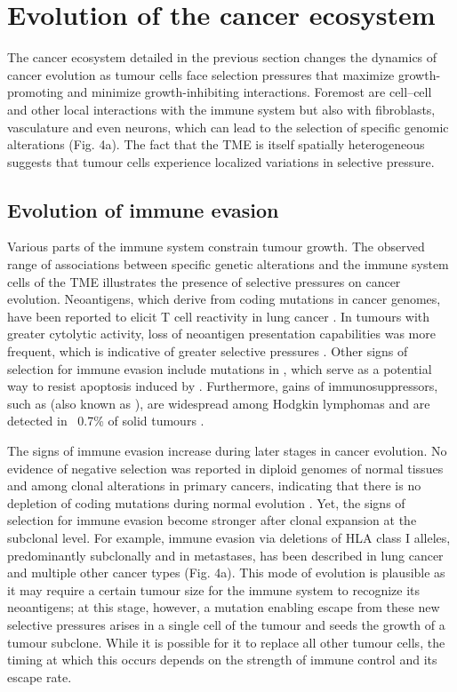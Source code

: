\section{Evolution of the cancer ecosystem}

The cancer ecosystem detailed in the previous section changes the dynamics of cancer evolution as tumour cells face selection pressures that maximize growth-promoting and minimize growth-inhibiting interactions. Foremost are cell–cell and other local interactions with the immune system but also with fibroblasts, vasculature and even neurons, which can lead to the selection of specific genomic alterations (Fig. 4a). The fact that the \ac{TME} is itself spatially heterogeneous suggests that tumour cells experience localized variations in selective pressure.

\subsection*{Evolution of immune evasion}

Various parts of the immune system constrain tumour growth. The observed range of associations between specific genetic alterations and the immune system cells of the \ac{TME} \parencite{Rooney2015-yb,Thorsson2019-fk} illustrates the presence of selective pressures on cancer evolution. Neoantigens, which derive from coding mutations in cancer genomes, have been reported to elicit T cell reactivity in lung cancer \parencite{McGranahan2016-yd}. In tumours with greater cytolytic activity, loss of neoantigen presentation capabilities was more frequent, which is indicative of greater selective pressures \parencite{Rooney2015-yb,Shukla2015-kl}. Other signs of selection for immune evasion include mutations in , which serve as a potential way to resist apoptosis induced by  \parencite{Rooney2015-yb}. Furthermore, gains of immunosuppressors, such as  (also known as ), are widespread among Hodgkin lymphomas and are detected in ~0.7\% of solid tumours \parencite{Goodman2018-mn}.

The signs of immune evasion increase during later stages in cancer evolution. No evidence of negative selection was reported in diploid genomes of normal tissues and among clonal alterations in primary cancers, indicating that there is no depletion of coding mutations during normal evolution \parencite{Martincorena2017-uw,Van_den_Eynden2019-aq}. Yet, the signs of selection for immune evasion become stronger after clonal expansion at the subclonal level. For example, immune evasion via deletions of \ac{HLA} class I alleles, predominantly subclonally and in metastases, has been described in lung cancer \parencite{McGranahan2017-ob} and multiple other cancer types \parencite{Watkins2020-gc} (Fig. 4a). This mode of evolution is plausible as it may require a certain tumour size for the immune system to recognize its neoantigens; at this stage, however, a mutation enabling escape from these new selective pressures arises in a single cell of the tumour and seeds the growth of a tumour subclone. While it is possible for it to replace all other tumour cells, the timing at which this occurs depends on the strength of immune control and its escape rate.

